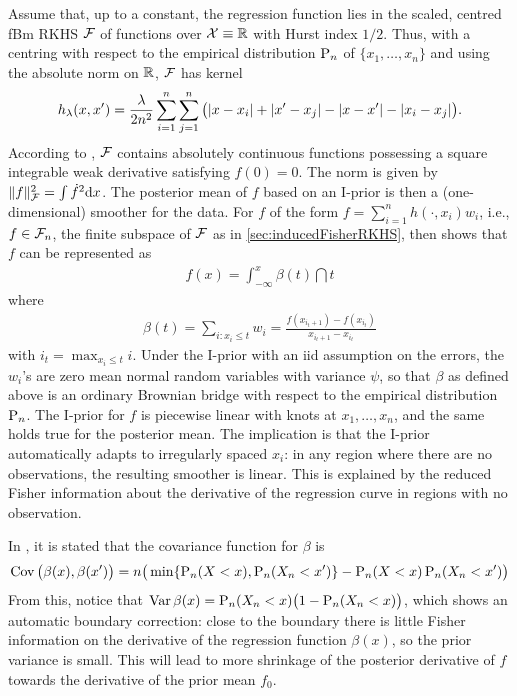 Assume that, up to a constant, the regression function lies in the scaled, centred fBm RKHS ${\mathcal F}$ of functions over ${\mathcal X} \equiv \mathbb{R}$ with Hurst index $1/2$.
Thus, with a centring with respect to the empirical distribution $\operatorname{P}_n$ of $\{x_1,\dots,x_n\}$ and using the absolute norm on $\mathbb{R}$, ${\mathcal F}$ has kernel
\[
  h_\lambda(x,x') = \frac{\lambda}{2n^2} \sum_{i=1}^n\sum_{j=1}^n \big( \lvert x-x_i\rvert + \lvert x'-x_j\rvert - \lvert x-x'\rvert - \lvert x_i-x_j\rvert \big).
\]
According to \citet[Section 10]{van2008reproducing}, ${\mathcal F}$ contains absolutely continuous functions possessing a square integrable weak derivative satisfying $f(0)=0$.
The norm is given by $\lVert f\rVert^2_{\mathcal F} = \int \dot f^2 \text{d} x$.
The posterior mean of $f$ based on an I-prior is then a (one-dimensional) smoother for the data.
For $f$ of the form $f = \sum_{i=1}^n h(\cdot,x_i)w_i$, i.e., $f\in{\mathcal F}_n$, the finite subspace of ${\mathcal F}$ as in \cref{sec:inducedFisherRKHS}, then \citet{bergsma2017} shows that $f$ can be represented as 
\begin{align}\label{eq:ipriorbrownianbridge}
  f(x) = \int_{-\infty}^x \beta(t) \dint t
\end{align}
where 
\begin{align}
  \beta(t) = \sum_{i:x_i \leq t} w_i =  \frac{f(x_{i_t + 1}) - f(x_{i_t})}{x_{i_t + 1} - x_{i_t}}
\end{align}
with $i_t = \max_{x_i \leq t} i$.
Under the I-prior with an iid assumption on the errors, the $w_i$'s are zero mean normal random variables with variance $\psi$, so that $\beta$ as defined above is an ordinary Brownian bridge with respect to the empirical distribution $\operatorname{P}_n$.
The I-prior for $f$ is piecewise linear with knots at $x_1,\dots,x_n$, and the same holds true for the posterior mean.
The implication is that the I-prior automatically adapts to irregularly spaced $x_i$: in any region where there are no observations, the resulting smoother is linear.
This is explained by the reduced Fisher information about the derivative of the regression curve in regions with no observation.

In \citet{bergsma2017}, it is stated that the covariance function for $\beta$ is 
\[
  \operatorname{Cov}\big(\beta(x),\beta(x') \big) = n\big( \min\{\operatorname{P}_n(X < x), \operatorname{P}_n(X_n < x') \} -  \operatorname{P}_n(X < x) \operatorname{P}_n(X_n < x') \big)
\]
From this, notice that $\operatorname{Var} \beta(x) = \operatorname{P}_n(X_n < x)\big(1 - \operatorname{P}_n(X_n < x) \big)$, which shows an automatic boundary correction: close to the boundary there is little Fisher information on the derivative of the regression function $\beta(x)$, so the prior variance is small.
This will lead to more shrinkage of the posterior derivative of $f$ towards the derivative of the prior mean $f_0$.

